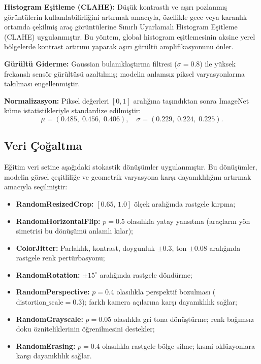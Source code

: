 \documentclass[conference]{IEEEtran}
\begin{document}
\textbf{Histogram Eşitleme (CLAHE):} Düşük kontrastlı ve aşırı pozlanmış
görüntülerin kullanılabilirliğini artırmak amacıyla, özellikle gece veya
karanlık ortamda çekilmiş araç görüntülerine Sınırlı Uyarlamalı Histogram
Eşitleme (CLAHE) uygulanmıştır. Bu yöntem, global histogram eşitlemesinin
aksine yerel bölgelerde kontrast artırımı yaparak aşırı gürültü
amplifikasyonunu önler.

\textbf{Gürültü Giderme:} Gaussian bulanıklaştırma filtresi ($\sigma=0.8$)
ile yüksek frekanslı sensör gürültüsü azaltılmış; modelin anlamsız
piksel varyasyonlarına takılması engellenmiştir.

\textbf{Normalizasyon:} Piksel değerleri $[0,1]$ aralığına taşındıktan
sonra ImageNet küme istatistikleriyle standardize edilmiştir:
\[
\mu = (0.485,\;0.456,\;0.406),\quad
\sigma = (0.229,\;0.224,\;0.225).
\]

\subsection{Veri Çoğaltma}

Eğitim veri setine aşağıdaki stokastik dönüşümler uygulanmıştır.
Bu dönüşümler, modelin görsel çeşitliliğe ve geometrik varyasyona
karşı dayanıklılığını artırmak amacıyla seçilmiştir:

\begin{itemize}[leftmargin=*, itemsep=1pt, topsep=2pt]
  \item \textbf{RandomResizedCrop:} $[0.65,\,1.0]$ ölçek aralığında
        rastgele kırpma;
  \item \textbf{RandomHorizontalFlip:} $p=0.5$ olasılıkla yatay yansıtma
        (araçların yön simetrisi bu dönüşümü anlamlı kılar);
  \item \textbf{ColorJitter:} Parlaklık, kontrast, doygunluk $\pm0.3$,
        ton $\pm0.08$ aralığında rastgele renk pertürbasyonu;
  \item \textbf{RandomRotation:} $\pm15^\circ$ aralığında rastgele döndürme;
  \item \textbf{RandomPerspective:} $p=0.4$ olasılıkla perspektif bozulması
        ($\mathrm{distortion\_scale}=0.3$); farklı kamera açılarına karşı
        dayanıklılık sağlar;
  \item \textbf{RandomGrayscale:} $p=0.05$ olasılıkla gri tona dönüştürme;
        renk bağımsız doku özniteliklerinin öğrenilmesini destekler;
  \item \textbf{RandomErasing:} $p=0.4$ olasılıkla rastgele bölge silme;
        kısmi oklüzyonlara karşı dayanıklılık sağlar.
\end{itemize}
\end{document}
